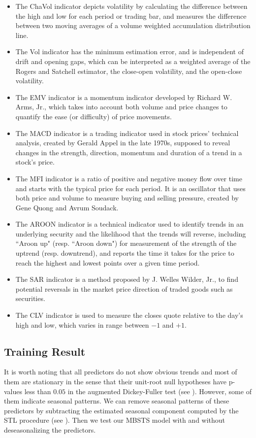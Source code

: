 \documentclass[twoside,11pt]{article}
\begin{document}
\begin{itemize}
\item The ChaVol indicator depicts volatility by calculating the difference between the high and low for each period or trading bar, and measures the difference between two moving averages of a volume weighted accumulation distribution line.
\item The Vol indicator has the minimum estimation error, and is independent of drift and opening gaps, which can be interpreted as a weighted average of the Rogers and Satchell estimator, the close-open volatility, and the open-close volatility.
\item The EMV indicator is a momentum indicator developed by Richard W. Arms, Jr., which takes into account both volume and price changes to quantify the ease (or difficulty) of price movements.
\item The MACD indicator is a trading indicator used in stock prices' technical analysis, created by Gerald Appel in the late 1970s, supposed to reveal changes in the strength, direction, momentum and duration of a trend in a stock's price.
\item The MFI indicator is a ratio of positive and negative money flow over time and starts with the typical price for each period. It is an oscillator that uses both price and volume to measure buying and selling pressure, created by Gene Quong and Avrum Soudack.
\item The AROON indicator is a technical indicator used to identify trends in an underlying security and the likelihood that the trends will reverse, including ``Aroon up" (resp. ``Aroon down")  for measurement of the strength of the uptrend (resp. downtrend), and reports the time it takes for the price to reach the highest and lowest points over a given time period.
\item The SAR indicator is a method proposed by J. Welles Wilder, Jr., to find potential reversals in the market price direction of traded goods such as securities.
\item The CLV indicator is used to measure the closes quote relative to the day's high and low, which varies in range between $-1$ and $+1$.
\end{itemize}

\subsection{Training Result}
It is worth noting that all predictors do not show obvious trends and most of them are stationary in the sense that their unit-root null hypotheses have p-values less than $0.05$ in the augmented Dickey-Fuller test (see \citealp{said1984testing}). However, some of them indicate seasonal patterns. We can remove seasonal patterns of these predictors by subtracting the estimated seasonal component computed by the STL procedure (see \citealp{cleveland1990stl}). Then we test our MBSTS model with and without deseasonalizing the predictors.
\end{document}
